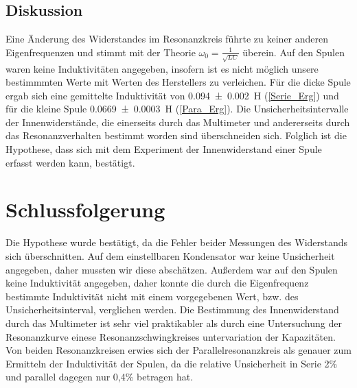 \documentclass[
	a4paper,
	12pt,
	pagesize,
	ngerman
]{scrartcl}
\begin{document}
	\subsection{Diskussion}
	Eine Änderung des Widerstandes im Resonanzkreis führte zu keiner anderen Eigenfrequenzen und stimmt mit der Theorie $\omega_0 = \frac{1}{\sqrt{LC}}$ überein. %
	Auf den Spulen waren keine Induktivitäten angegeben, insofern ist es nicht möglich unsere bestimmmten Werte mit Werten des Herstellers zu verleichen.
	Für die dicke Spule ergab sich eine gemittelte Induktivität von \SI{0,094 \pm 0,002}{H} (\cref{Serie_Erg}) und für die kleine Spule \SI{0,0669 \pm 0,0003}{H} (\cref{Para_Erg}).
	Die Unsicherheitsintervalle der Innenwiderstände, die einerseits durch das Multimeter und andererseits durch das Resonanzverhalten bestimmt worden sind überschneiden sich. 
	Folglich ist die Hypothese, dass sich mit dem Experiment der Innenwiderstand einer Spule erfasst werden kann, bestätigt.
	
	\section{Schlussfolgerung}
	Die Hypothese wurde bestätigt, da die Fehler beider Messungen des Widerstands sich überschnitten.
	Auf dem einstellbaren Kondensator war keine Unsicherheit angegeben, daher mussten wir diese abschätzen.
	Außerdem war auf den Spulen keine Induktivität angegeben, daher konnte die durch die Eigenfrequenz bestimmte Induktivität nicht mit einem vorgegebenen Wert, bzw. des Unsicherheitsinterval, verglichen werden.
	Die Bestimmung des Innenwiderstand durch das Multimeter ist sehr viel praktikabler als durch eine Untersuchung der Resonanzkurve einese Resonanzschwingkreises untervariation der Kapazitäten.
	Von beiden Resonanzkreisen erwies sich der Parallelresonanzkreis als genauer zum Ermitteln der Induktivität der Spulen, da die relative Unsicherheit in Serie 2\% und parallel dagegen nur 0,4\% betragen hat.
	
	
	\printbibliography
\end{document}
